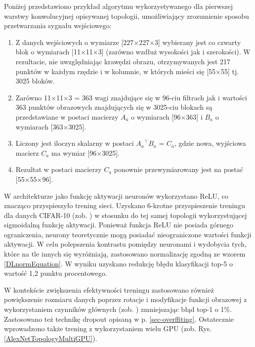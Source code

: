 Poniżej przedstawiono przykład algorytmu wykorzystywanego dla pierwszej warstwy konwolucyjnej opisywanej topologii, umożliwiający zrozumienie sposobu przetwarzania sygnału wejściowego: 
\begin{enumerate}
\item Z danych wejściowych o wymiarze [227$\times$227$\times$3] wybierany jest co czwarty blok  o wymiarach [11$\times$11$\times$3] (zarówno wzdłuż wysokości jak i szerokości). W rezultacie, nie uwzględniając krawędzi obrazu, otrzymywanych jest 217 punktów w każdym rzędzie i w kolumnie, w których mieści się [55$\times$55] tj. 3025 bloków.
\item Zarówno 11$\times$11$\times$3 = 363 wagi znajdujące się w 96-ciu filtrach jak i wartości 363 punktów obrazowych znajdujących się w 3025-ciu blokach są przedstawiane w postaci macierzy $A_a$ o wymiarach [96$\times$363] i $B_a$ o wymiarach [363$\times$3025].
\item Liczony jest iloczyn skalarny w postaci $A_a$$^\intercal$$B_a$ = $C_a$, gdzie nowa, wyjściowa macierz $C_a$ ma wymiar [96$\times$3025].
\item Rezultat w postaci macierzy $C_a$ ponownie przewymiarowany jest na postać [55$\times$55$\times$96].  
\end{enumerate} 

W architekturze jako funkcję aktywacji neuronów wykorzystano ReLU, co znacząco przyspieszyło trening sieci. Uzyskano 6-krotne przyspieszenie treningu dla danych CIFAR-10 (zob. \cite{CIFAR}) w stosunku do tej samej topologii wykorzystującej sigmoidalną funkcję aktywacji. Ponieważ funkcja ReLU nie posiada górnego ograniczenia, neurony teoretycznie mogą posiadać nieograniczone wartości funkcji aktywacji. \linebreak W celu polepszenia kontrastu pomiędzy neuronami i wydobycia tych, które na tle innych się wyróżniają, zastosowano normalizację zgodną ze wzorem \ref{DLnormEquation}. W wyniku uzyskano redukcję błędu klasyfikacji top-5 o wartość 1,2 punktu procentowego.

W kontekście zwiększenia efektywności treningu zastosowano również powiększenie rozmiaru danych poprzez rotacje i modyfikacje funkcji obrazowej z wykorzystaniem czynników głównych (zob. \cite{Krizhevsky2012}) zmniejszając błąd top-1 o 1\%. Zastosowano też technikę dropout opisaną w p. \ref{sec-overffiting}. Ostatecznie wprowadzono także trening \linebreak z wykorzystaniem wielu GPU (zob. Rys. \ref{AlexNetTopologyMultiGPU}). 

